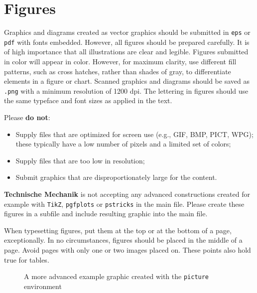 \documentclass{techmech}
\begin{document}
\section{Figures}
Graphics and diagrams created as vector graphics should be submitted in \texttt{eps} or \texttt{pdf} with fonts embedded. However, all figures should be prepared carefully. It is of high importance that all illustrations are clear and legible. Figures submitted in color will appear in color. However, for maximum clarity, use different fill patterns, such as cross hatches, rather than shades of gray, to differentiate elements in a figure or chart. Scanned graphics and diagrams should be saved as \texttt{.png} with a minimum resolution of 1200 dpi. The lettering in figures should use the same typeface and font sizes as applied in the text. 

Please \textbf{do not}:
\begin{itemize}
\item Supply files that are optimized for screen use (e.g., GIF, BMP, PICT, WPG); these typically have a
low number of pixels and a limited set of colors;
\item Supply files that are too low in resolution;
\item Submit graphics that are disproportionately large for the content.
\end{itemize}

\textsf{\bfseries Technische Mechanik} is not accepting any advanced constructions created for example with \texttt{TikZ}, \texttt{pgfplots} or \texttt{pstricks} in the main file. Please create these figures in a subfile and include resulting graphic into the main file.

When typesetting figures, put them at the top or at the bottom of a page, exceptionally. In no circumstances, figures should be placed in the middle of a page. Avoid pages with only one or two images placed on. These points also hold true for tables.

\begin{figure*}[t]
\caption{A more advanced example graphic created with the \texttt{picture} environment}
\label{fig-1}
\end{figure*}

\end{document}
